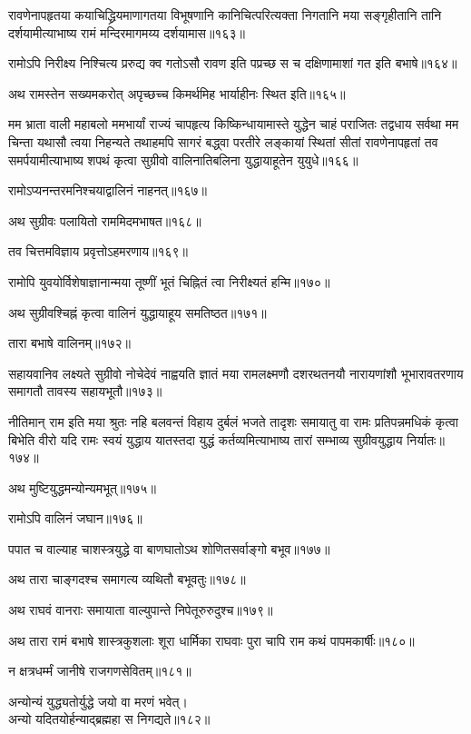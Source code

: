 \begin{flushleft}

रावणेनापहृतया कयाचिद्ध्रियमाणागतया विभूषणानि कानिचित्परित्यक्ता निगतानि मया सङ्गृहीतानि तानि दर्शयामीत्याभाष्य रामं मन्दिरमागमय्य दर्शयामास॥१६३॥

रामोऽपि निरीक्ष्य निश्चित्य प्ररुद्य क्व गतोऽसौ रावण इति पप्रच्छ स च दक्षिणामाशां गत इति बभाषे॥१६४॥

अथ रामस्तेन सख्यमकरोत् अपृच्छच्च किमर्थमिह भार्याहीनः स्थित इति॥१६५॥


मम भ्राता वाली महाबलो ममभार्यां राज्यं चापहृत्य किष्किन्धायामास्ते युद्धेन चाहं पराजितः तद्वधाय सर्वथा मम चिन्ता यथासौ त्वया निहन्यते तथाहमपि सागरं बद्ध्वा परतीरे लङ्कायां स्थितां सीतां रावणेनापहृतां तव समर्पयामीत्याभाष्य शपथं कृत्वा सुग्रीवो वालिनातिबलिना युद्धायाहूतेन युयुधे॥१६६॥

रामोऽप्यनन्तरमनिश्चयाद्वालिनं नाहनत्॥१६७॥

अथ सुग्रीवः पलायितो राममिदमभाषत॥१६८॥

तव चित्तमविज्ञाय प्रवृत्तोऽहमरणाय॥१६९॥

रामोपि युवयोर्विशेषाज्ञानान्मया तूष्णीं भूतं चिह्नितं त्वा निरीक्ष्यतं हन्मि॥१७०॥

अथ सुग्रीवश्चिह्नं कृत्वा वालिनं युद्धायाहूय समतिष्ठत॥१७१॥

तारा बभाषे वालिनम्॥१७२॥

सहायवानिव लक्ष्यते सुग्रीवो नोचेदेवं नाह्वयति ज्ञातं मया रामलक्ष्मणौ दशरथतनयौ नारायणांशौ भूभारावतरणाय समागतौ तावस्य सहायभूतौ॥१७३॥


नीतिमान् राम इति मया श्रुतः नहि बलवन्तं विहाय दुर्बलं भजते तादृशः समायातु वा रामः प्रतिपन्नमधिकं कृत्वा बिभेति वीरो यदि रामः स्वयं युद्धाय यातस्तदा युद्धं कर्तव्यमित्याभाष्य तारां सम्भाव्य सुग्रीवयुद्धाय निर्यातः॥१७४॥

अथ मुष्टियुद्धमन्योन्यमभूत्॥१७५॥

रामोऽपि वालिनं जघान॥१७६॥

पपात च वाल्याह चाशस्त्रयुद्धे वा बाणघातोऽथ शोणितसर्वाङ्गो बभूव॥१७७॥

अथ तारा चाङ्गदश्च समागत्य व्यथितौ बभूवतुः॥१७८॥

अथ राघवं वानराः समायाता वाल्युपान्ते निपेतूरुरुदुश्च॥१७९॥

अथ तारा रामं बभाषे शास्त्रकुशलाः शूरा धार्मिका राघवाः पुरा चापि राम कथं पापमकार्षीः॥१८०॥

न क्षत्रधर्म्मं जानीषे राजगणसेवितम्॥१८१॥

अन्योन्यं युद्ध्यतोर्युद्धे जयो वा मरणं भवेत्।\\
अन्यो यदितयोर्हन्याद्ब्रह्महा स निगद्यते॥१८२॥


\end{flushleft}
